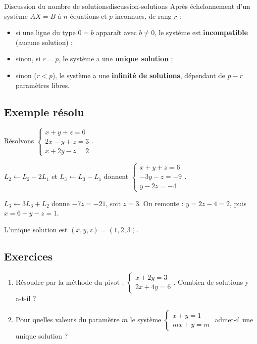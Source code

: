 \documentclass[theme=pringlea]{myrtille}
\begin{document}
\begin{myrthm}{Discussion du nombre de solutions}{discussion-solutions}
Après échelonnement d'un système $AX=B$ à $n$ équations et $p$ inconnues, de rang $r$ :
\begin{itemize}
    \item si une ligne du type $0 = b$ apparaît avec $b \neq 0$, le système est \textbf{incompatible} (aucune solution) ;
    \item sinon, si $r = p$, le système a une \textbf{unique solution} ;
    \item sinon ($r < p$), le système a une \textbf{infinité de solutions}, dépendant de $p - r$ paramètres libres.
\end{itemize}
\end{myrthm}

\subsection{Exemple résolu}
\begin{infobox}
Résolvons $\begin{cases} x + y + z = 6 \\ 2x - y + z = 3 \\ x + 2y - z = 2 \end{cases}$.

$L_2 \leftarrow L_2 - 2L_1$ et $L_3 \leftarrow L_3 - L_1$ donnent $\begin{cases} x+y+z=6 \\ -3y-z=-9 \\ y-2z=-4 \end{cases}$.

$L_3 \leftarrow 3L_3 + L_2$ donne $-7z = -21$, soit $z=3$. On remonte : $y = 2z-4 = 2$, puis $x = 6-y-z = 1$.

L'unique solution est $(x,y,z) = (1,2,3)$.
\end{infobox}

\subsection{Exercices}
\begin{enumerate}
    \item Résoudre par la méthode du pivot : $\begin{cases} x + 2y = 3 \\ 2x + 4y = 6 \end{cases}$. Combien de solutions y a-t-il ?
    \item Pour quelles valeurs du paramètre $m$ le système $\begin{cases} x + y = 1 \\ mx + y = m \end{cases}$ admet-il une unique solution ?
\end{enumerate}
\end{document}
